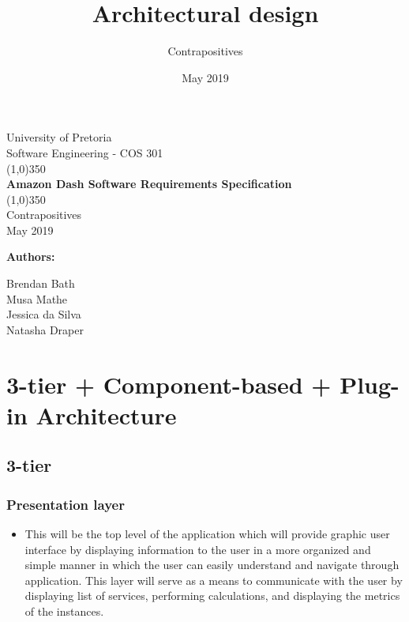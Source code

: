 \documentclass{article}
\title{Architectural design}
\author{Contrapositives }
\date{May 2019}
\begin{document}
\begin{titlepage}
	\begin{center}
	\huge{University of Pretoria\\
	Software Engineering - COS 301}\\
	\line(1,0){350}\\
	\huge{\bfseries Amazon Dash Software Requirements Specification}\\
	\line(1,0){350}\\
	Contrapositives\\
	May 2019\\
	[3cm]
	\end{center}
	\begin{flushleft}
	\bfseries{Authors:}
	\end{flushleft}
	\begin{flushleft}
	Brendan Bath \\
	Musa Mathe			\\
	Jessica da Silva			\\
	Natasha Draper     \\

	\end{flushleft}
\end{titlepage}
\maketitle

\newpage
\section{3-tier + Component-based + Plug-in Architecture}
     \subsection{3-tier}
        \subsubsection{Presentation layer}
            \begin{itemize}
                \item This will be the top level of the application which will provide graphic user interface by displaying information to the user in a more organized and simple manner in which the user can easily understand and navigate through application. This layer will serve as a means to communicate with the user by displaying list of services, performing calculations, and displaying the metrics of the instances.
            \end{itemize}
\end{document}

